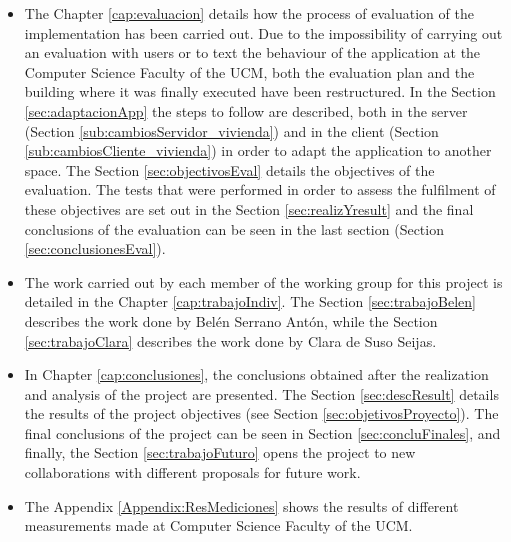 \begin{itemize}
	\item The Chapter \ref{cap:evaluacion} details how the process of evaluation of the implementation has been carried out. Due to the impossibility of carrying out an evaluation with users or to text the behaviour of the application at the Computer Science Faculty of the UCM, both the evaluation plan and the building where it was finally executed have been restructured. In the Section \ref{sec:adaptacionApp} the steps to follow are described, both in the server (Section \ref{sub:cambiosServidor_vivienda}) and in the client (Section \ref{sub:cambiosCliente_vivienda}) in order to adapt the application to another space. The Section \ref{sec:objectivosEval} details the objectives of the evaluation. The tests that were performed in order to assess the fulfilment of these objectives are set out in the Section \ref{sec:realizYresult} and the final conclusions of the evaluation can be seen in the last section (Section \ref{sec:conclusionesEval}).
	
	\item The work carried out by each member of the working group for this project is detailed in the Chapter \ref{cap:trabajoIndiv}. The Section \ref{sec:trabajoBelen} describes the work done by Belén Serrano Antón, while the Section \ref{sec:trabajoClara} describes the work done by Clara de Suso Seijas.
	
	\item In Chapter \ref{cap:conclusiones}, the conclusions obtained after the realization and analysis of the project are presented. The Section \ref{sec:descResult} details the results of the project objectives (see Section \ref{sec:objetivosProyecto}). The final conclusions of the project can be seen in Section \ref{sec:concluFinales}, and finally, the Section \ref{sec:trabajoFuturo} opens the project to new collaborations with different proposals for future work.
	
	\item The Appendix \ref{Appendix:ResMediciones} shows the results of different measurements made at Computer Science Faculty of the UCM.
	
\end{itemize}










